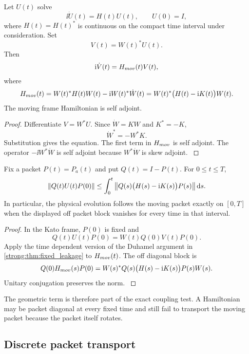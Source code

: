 \begin{theorem}\label{strong:theorem:014}\label{strong:thm:moving_frame}
Let \(U(t)\) solve
\[
\ii\dot U(t)=H(t)U(t),
\qquad
U(0)=I,
\]
where \(H(t)=H(t)^*\) is continuous on the compact time interval under consideration. Set
\[
V(t)=W(t)^*U(t).
\]
Then
\[
\ii\dot V(t)=H_{\rm mov}(t)V(t),
\]
where
\[
H_{\rm mov}(t)
=
W(t)^*H(t)W(t)-\ii W(t)^*\dot W(t)
=
W(t)^*\bigl(H(t)-\ii K(t)\bigr)W(t).
\]
The moving frame Hamiltonian is self adjoint.
\end{theorem}

\begin{proof}\label{strong:proof:023}
Differentiate \(V=W^*U\). Since \(\dot W=KW\) and \(K^*=-K\),
\[
\dot W^*=-W^*K.
\]
Substitution gives the equation. The first term in \(H_{\rm mov}\) is self adjoint. The operator \(-\ii W^*\dot W\) is self adjoint because \(W^*\dot W\) is skew adjoint.
\label{strong:proof:023:end}\end{proof}

\begin{theorem}\label{strong:theorem:015}\label{strong:thm:moving_leakage}
Fix a packet \(P(t)=P_a(t)\) and put \(Q(t)=I-P(t)\). For \(0\leq t\leq T\),
\[
\norm{Q(t)U(t)P(0)}
\leq
\int_0^t
\norm{Q(s)\bigl(H(s)-\ii K(s)\bigr)P(s)}
\dd s.
\]
In particular, the physical evolution follows the moving packet exactly on \([0,T]\) when the displayed off packet block vanishes for every time in that interval.
\end{theorem}

\begin{proof}\label{strong:proof:024}
In the Kato frame, \(P(0)\) is fixed and
\[
Q(t)U(t)P(0)
=
W(t)Q(0)V(t)P(0).
\]
Apply the time dependent version of the Duhamel argument in \cref{strong:thm:fixed_leakage} to \(H_{\rm mov}(t)\). The off diagonal block is
\[
Q(0)H_{\rm mov}(s)P(0)
=
W(s)^*Q(s)\bigl(H(s)-\ii K(s)\bigr)P(s)W(s).
\]
Unitary conjugation preserves the norm.
\label{strong:proof:024:end}\end{proof}

The geometric term is therefore part of the exact coupling test. A Hamiltonian may be packet diagonal at every fixed time and still fail to transport the moving packet because the packet itself rotates.

\subsection{Discrete packet transport}\label{strong:subsec:discrete_transport}

